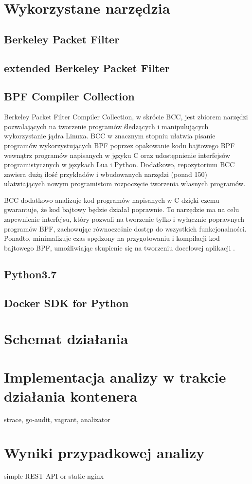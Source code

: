 \section{Wykorzystane narzędzia}

\subsection{Berkeley Packet Filter}

\subsection{extended Berkeley Packet Filter}

\subsection{BPF Compiler Collection}

Berkeley Packet Filter Compiler Collection, w skrócie BCC, jest zbiorem narzędzi pozwalających na tworzenie programów śledzących i manipulujących wykorzystanie jądra Linuxa. BCC w znacznym stopniu ułatwia pisanie programów wykorzystujących BPF poprzez opakowanie kodu bajtowego BPF wewnątrz programów napisanych w języku C oraz udostępnienie interfejsów programistycznych w językach Lua i Python. Dodatkowo, repozytorium BCC zawiera dużą ilość przykładów i wbudowanych narzędzi (ponad 150) ułatwiających nowym programistom rozpoczęcie tworzenia własnych programów.

BCC dodatkowo analizuje kod programów napisanych w C dzięki czemu gwarantuje, że kod bajtowy będzie działał poprawnie. To narzędzie ma na celu zapewnienie interfejsu, który pozwali na tworzenie tylko i wyłącznie poprawnych programów BPF, zachowując równocześnie dostęp do wszystkich funkcjonalności. Ponadto, minimalizuje czas spędzony na przygotowaniu i kompilacji kod bajtowego BPF, umożliwiając skupienie się na tworzeniu docelowej aplikacji \cite{BCCReadme}.

\subsection{Python3.7}

\subsection{Docker SDK for Python}

\section{Schemat działania}

\section{Implementacja analizy w trakcie działania kontenera}

strace, go-audit, vagrant, analizator

\section{Wyniki przypadkowej analizy}

simple REST API or static nginx
